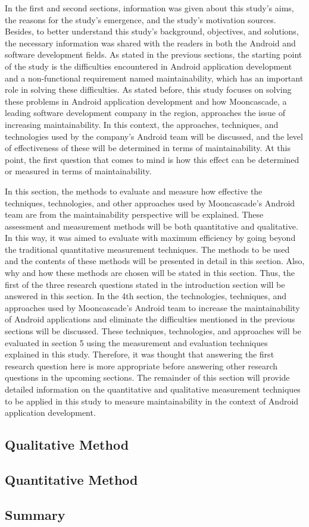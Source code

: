 In the first and second sections, information was given about this study's aims, the reasons for the study's emergence, and the study's motivation sources. Besides, to better understand this study's background, objectives, and solutions, the necessary information was shared with the readers in both the Android and software development fields. As stated in the previous sections, the starting point of the study is the difficulties encountered in Android application development and a non-functional requirement named maintainability, which has an important role in solving these difficulties. As stated before, this study focuses on solving these problems in Android application development and how Mooncascade, a leading software development company in the region, approaches the issue of increasing maintainability. In this context, the approaches, techniques, and technologies used by the company's Android team will be discussed, and the level of effectiveness of these will be determined in terms of maintainability. At this point, the first question that comes to mind is how this effect can be determined or measured in terms of maintainability.

In this section,  the methods to evaluate and measure how effective the techniques, technologies, and other approaches used by Mooncascade's Android team are from the maintainability perspective will be explained. These assessment and measurement methods will be both quantitative and qualitative. In this way, it was aimed to evaluate with maximum efficiency by going beyond the traditional quantitative measurement techniques. The methods to be used and the contents of these methods will be presented in detail in this section. Also, why and how these methods are chosen will be stated in this section. Thus, the first of the three research questions stated in the introduction section will be answered in this section. In the 4th section, the technologies, techniques, and approaches used by Mooncascade's Android team to increase the maintainability of Android applications and eliminate the difficulties mentioned in the previous sections will be discussed. These techniques, technologies, and approaches will be evaluated in section 5 using the measurement and evaluation techniques explained in this study. Therefore, it was thought that answering the first research question here is more appropriate before answering other research questions in the upcoming sections. The remainder of this section will provide detailed information on the quantitative and qualitative measurement techniques to be applied in this study to measure maintainability in the context of Android application development. 

\subsection{Qualitative Method}


\subsection{Quantitative Method}


\subsection{Summary}

